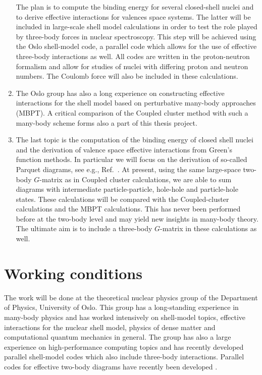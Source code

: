\documentclass{article}
\begin{document}
\begin{enumerate}
The plan is to compute the binding energy for several 
closed-shell nuclei and to
derive effective interactions for valences space systems. The latter will
be included in large-scale shell model calculations in order to test
the role played by three-body forces in nuclear spectroscopy.
This step will be achieved using the Oslo shell-model code, a parallel code
which allows for the use of effective three-body interactions as well.
All codes are written in the proton-neutron formalism and allow for studies
of nuclei with differing proton and neutron numbers. The Coulomb force
will also be included in these calculations.

\item The Oslo group has also a long experience on constructing
effective interactions for the shell model based on perturbative
many-body approaches (MBPT). A critical comparison of the Coupled cluster
method with such a many-body scheme forms also a part of this thesis
project.

\item The last topic is the computation of the binding energy of closed
shell nuclei and the derivation of valence space effective interactions
from Green's function methods. In particular we will focus on the derivation
of so-called Parquet diagrams, see e.g., Ref.\ \cite{mhj1998}. 
At present, using the same large-space two-body $G$-matrix as in Coupled
cluster calculations, we are able to sum diagrams with intermediate particle-particle, hole-hole and particle-hole states. 
These calculations will be compared with the Coupled-cluster calculations 
and the MBPT calculations. This has never been performed before at the two-body level and may yield new insights in many-body theory.
The ultimate aim is to include a three-body $G$-matrix in these calculations as
well.
\end{enumerate}

\section{Working conditions}
The work will be done at  the theoretical 
nuclear physics group of the
Department of Physics, University of Oslo. This
group has a long-standing experience in many-body physics
and has worked intensively on shell-model topics, effective 
interactions for the nuclear shell model, 
physics of dense matter and computational quantum mechanics in general. 
The group has also a large experience on high-performance computing topics
and has recently developed parallel shell-model codes which 
also include three-body interactions. Parallel codes for effective two-body
diagrams have recently been developed \cite{khj2002}.
\end{document}
